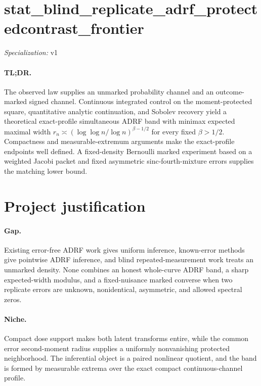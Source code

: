\documentclass{article}
\begin{document}
\sloppy

\section*{stat\_\allowbreak{}blind\_\allowbreak{}replicate\_\allowbreak{}adrf\_\allowbreak{}protectedcontrast\_\allowbreak{}frontier}

\noindent\textit{Specialization:} v1\par

\paragraph{TL;DR.} The observed law supplies an unmarked probability channel and an outcome-marked signed channel. Continuous integrated control on the moment-protected square, quantitative analytic continuation, and Sobolev recovery yield a theoretical exact-profile simultaneous ADRF band with minimax expected maximal width \(r_n\asymp(\log\log n/\log n)^{\beta-1/2}\) for every fixed \(\beta>1/2\). Compactness and measurable-extremum arguments make the exact-profile endpoints well defined. A fixed-density Bernoulli marked experiment based on a weighted Jacobi packet and fixed asymmetric sinc-fourth-mixture errors supplies the matching lower bound.

\section{Project justification}

\paragraph{Gap.} Existing error-free ADRF work gives uniform inference, known-error methods give pointwise ADRF inference, and blind repeated-measurement work treats an unmarked density. None combines an honest whole-curve ADRF band, a sharp expected-width modulus, and a fixed-nuisance marked converse when two replicate errors are unknown, nonidentical, asymmetric, and allowed spectral zeros.

\paragraph{Niche.} Compact dose support makes both latent transforms entire, while the common error second-moment radius supplies a uniformly nonvanishing protected neighborhood. The inferential object is a paired nonlinear quotient, and the band is formed by measurable extrema over the exact compact continuous-channel profile.
\end{document}
